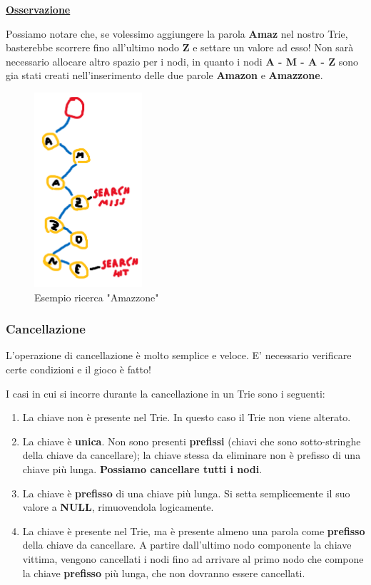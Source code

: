\documentclass[a4paper, 12pt]{article}
\begin{document}
\textbf{\underline{Osservazione}}

Possiamo notare che, se volessimo aggiungere la parola \textbf{Amaz} nel nostro Trie, basterebbe scorrere fino all'ultimo nodo \textbf{Z} e settare un valore ad esso! Non sarà necessario allocare altro spazio per i nodi, in quanto i nodi \textbf{A - M - A - Z} sono gia stati creati nell'inserimento delle due parole \textbf{Amazon} e \textbf{Amazzone}. 

\begin{figure}[ht!]
    \centering
    \includegraphics[width=4cm]{Images/ricerca.png}
    \caption{Esempio ricerca "Amazzone"}
    \label{fig:my_label}
\end{figure}

\subsubsection{Cancellazione}
L'operazione di cancellazione è molto semplice e veloce. E' necessario verificare certe condizioni e il gioco è fatto!

I casi in cui si incorre durante la cancellazione in un Trie sono i seguenti:

\begin{enumerate}
    \item La chiave non è presente nel Trie. In questo caso il Trie non viene alterato.
    
    \item La chiave è \textbf{unica}. Non sono presenti \textbf{prefissi} (chiavi che sono sotto-stringhe della chiave da cancellare); la chiave stessa da eliminare non è prefisso di una chiave più lunga. \textbf{Possiamo cancellare tutti i nodi}.
    
    \item La chiave è \textbf{prefisso} di una chiave più lunga. Si setta semplicemente il suo valore a \textbf{NULL}, rimuovendola logicamente.
    
    \item La chiave è presente nel Trie, ma è presente almeno una parola come \textbf{prefisso} della chiave da cancellare. A partire dall'ultimo nodo componente la chiave vittima, vengono cancellati i nodi fino ad arrivare al primo nodo che compone la chiave \textbf{prefisso} più lunga, che non dovranno essere cancellati.
\end{enumerate}
\end{document}

